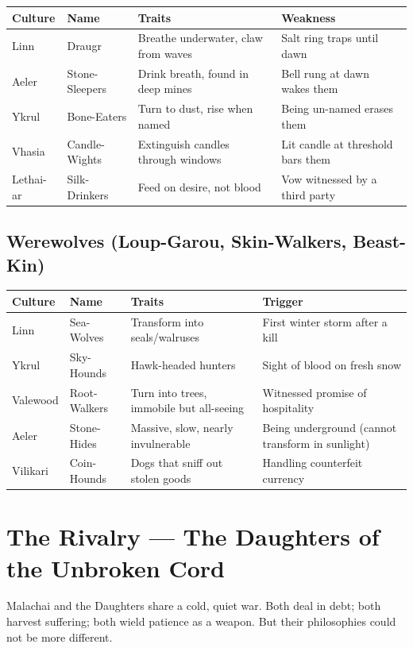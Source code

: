 \documentclass[10pt,twoside]{book}
\begin{document}
\begin{tabular}{@{}p{}p{}p{}p{}@{}}
\toprule
\textbf{Culture} & \textbf{Name} & \textbf{Traits} & \textbf{Weakness} \\
\midrule
Linn & Draugr & Breathe underwater, claw from waves & Salt ring traps until dawn \\
Aeler & Stone-Sleepers & Drink breath, found in deep mines & Bell rung at dawn wakes them \\
Ykrul & Bone-Eaters & Turn to dust, rise when named & Being un-named erases them \\
Vhasia & Candle-Wights & Extinguish candles through windows & Lit candle at threshold bars them \\
Lethai-ar & Silk-Drinkers & Feed on desire, not blood & Vow witnessed by a third party \\
\bottomrule
\end{tabular}

\section{Werewolves (Loup-Garou, Skin-Walkers, Beast-Kin)}

\begin{tabular}{@{}p{}p{}p{}p{}@{}}
\toprule
\textbf{Culture} & \textbf{Name} & \textbf{Traits} & \textbf{Trigger} \\
\midrule
Linn & Sea-Wolves & Transform into seals/walruses & First winter storm after a kill \\
Ykrul & Sky-Hounds & Hawk-headed hunters & Sight of blood on fresh snow \\
Valewood & Root-Walkers & Turn into trees, immobile but all-seeing & Witnessed promise of hospitality \\
Aeler & Stone-Hides & Massive, slow, nearly invulnerable & Being underground (cannot transform in sunlight) \\
Vilikari & Coin-Hounds & Dogs that sniff out stolen goods & Handling counterfeit currency \\
\bottomrule
\end{tabular}

\chapter{The Rivalry --- The Daughters of the Unbroken Cord}

Malachai and the Daughters share a cold, quiet war. Both deal in debt; both harvest suffering; both wield patience as a weapon. But their philosophies could not be more different.
\end{document}
